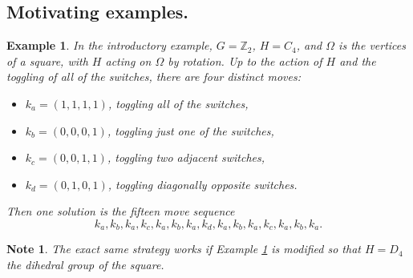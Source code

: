 \documentclass{article}
\numberwithin{equation}{subsection}
\newtheorem{example}[theo]{Example}
\newtheorem{note}[theo]{Note}
\begin{document}
\subsection{Motivating examples.}
\begin{example}
  \label{canonicalSwitchExample}
  In the introductory example, $G = \mathbb Z_2$, $H = C_4$, and $\Omega$ is the
  vertices of a square, with $H$ acting on $\Omega$ by rotation.
  Up to the action of $H$ and the toggling of all of the switches, there are
  four distinct moves: \begin{itemize}
    \item $k_a = (1,1,1,1)$, toggling all of the switches,
    \item $k_b = (0,0,0,1)$, toggling just one of the switches,
    \item $k_c = (0,0,1,1)$, toggling two adjacent switches,
    \item $k_d = (0,1,0,1)$, toggling diagonally opposite switches.
  \end{itemize}
  Then one solution is the fifteen move sequence \begin{equation}
    k_a, k_b, k_a, k_c, k_a, k_b, k_a, k_d, k_a, k_b, k_a, k_c, k_a, k_b, k_a.
  \end{equation}
\end{example}
\begin{note}
  The exact same strategy works if Example \ref{canonicalSwitchExample} is
  modified so that $H = D_4$ the dihedral group of the square.
\end{note}
\end{document}
